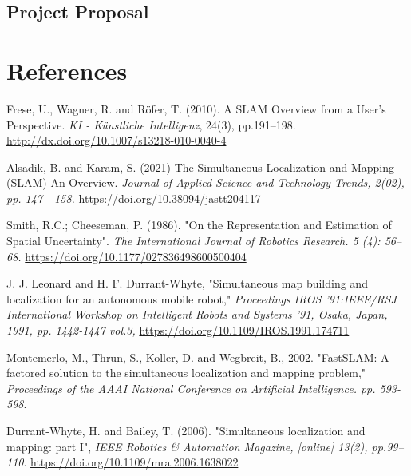 \documentclass[12pt]{article}
\begin{document}
\subsection{Project Proposal}



\section{References}

\begin{thebibliography}{9}

    Frese, U., Wagner, R. and Röfer, T. (2010). A SLAM Overview from a User’s Perspective.
    \textit{KI - Künstliche Intelligenz}, 24(3), pp.191–198.
    \href{http://dx.doi.org/10.1007/s13218-010-0040-4}{http://dx.doi.org/10.1007/s13218-010-0040-4}

    Alsadik, B. and Karam, S. (2021) The Simultaneous Localization and Mapping (SLAM)-An Overview.
    \textit{Journal of Applied Science and Technology Trends, 2(02), pp. 147 - 158.}
    \href{https://doi.org/10.38094/jastt204117}{https://doi.org/10.38094/jastt204117}

    Smith, R.C.; Cheeseman, P. (1986). "On the Representation and Estimation of Spatial Uncertainty".
    \textit{The International Journal of Robotics Research. 5 (4): 56–68.}
    \href{https://doi.org/10.1177/027836498600500404}{https://doi.org/10.1177/027836498600500404}

    J. J. Leonard and H. F. Durrant-Whyte, "Simultaneous map building and localization for an autonomous mobile robot,"
    \textit{Proceedings IROS '91:IEEE/RSJ International Workshop on Intelligent Robots and Systems '91, Osaka, Japan, 1991, pp. 1442-1447 vol.3,}
    \href{https://doi.org/10.1109/IROS.1991.174711}{https://doi.org/10.1109/IROS.1991.174711}

    Montemerlo, M., Thrun, S., Koller, D. and Wegbreit, B., 2002. "FastSLAM: A factored solution to the simultaneous localization and mapping problem,"
    \textit{Proceedings of the AAAI National Conference on Artificial Intelligence. pp. 593-598}.

    Durrant-Whyte, H. and Bailey, T. (2006). "Simultaneous localization and mapping: part I",
    \textit{IEEE Robotics & Automation Magazine, [online] 13(2), pp.99–110}.
    \href{https://doi.org/10.1109/mra.2006.1638022}{https://doi.org/10.1109/mra.2006.1638022}


\end{thebibliography}
\end{document}

